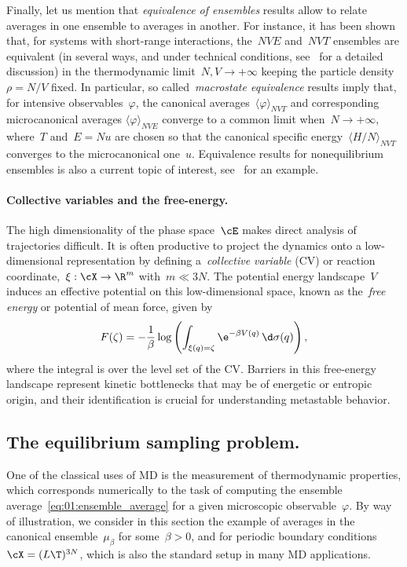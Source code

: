 Finally, let us mention that \textit{equivalence of ensembles} results allow to relate averages in one ensemble to averages in another. For instance, it has been shown that, for systems with short-range interactions, the~$NVE$ and~$NVT$ ensembles are equivalent (in several ways, and under technical conditions, see~\cite{T15} for a detailed discussion) in the thermodynamic limit~$N,V\to +\infty$ keeping the particle density~$\rho = N/V$ fixed.
In particular, so called~\textit{macrostate equivalence} results imply that, for intensive observables~$\varphi$, the canonical averages~$\langle\varphi\rangle_{NVT}$  and corresponding microcanonical averages $\langle \varphi\rangle_{NVE}$ converge to a common limit when~$N\to +\infty$, where~$T$ and~${E=Nu}$ are chosen so that the canonical specific energy~$\langle H/N\rangle_{NVT}$ converges to the microcanonical one~$u$.
Equivalence results for nonequilibrium ensembles is also a current topic of interest, see~\cite{CT13} for an example.

\paragraph{Collective variables and the free-energy.}
The high dimensionality of the phase space~$\cE$ makes direct analysis of trajectories difficult. It is often productive to project the dynamics onto a low-dimensional representation by defining a~\textit{collective variable} (CV) or reaction coordinate,~$\xi:\cX\to\R^m$ with~$m\ll 3N$. The potential energy landscape~$V$ induces an effective potential on this low-dimensional space, known as the~\textit{free energy} or potential of mean force, given by
\[ F(\zeta) = -\frac{1}{\beta}\log\left(\int_{\xi(q)=\zeta} \e^{-\beta V(q)}\,\d\sigma(q)\right),\]
where the integral is over the level set of the CV. Barriers in this free-energy landscape represent kinetic bottlenecks that may be of energetic or entropic origin, and their identification is crucial for understanding metastable behavior.

\subsection{The equilibrium sampling problem.}
\label{subsec:01:sampling}
One of the classical uses of MD is the measurement of thermodynamic properties, which corresponds numerically to the task of computing the ensemble average~\eqref{eq:01:ensemble_average} for a given microscopic observable~$\varphi$.
By way of illustration, we consider in this section the example of averages in the canonical ensemble~$\mu_\beta$ for some~$\beta>0$, and for periodic boundary conditions~$\cX=(L\T)^{3N}$, which is also the standard setup in many MD applications.

